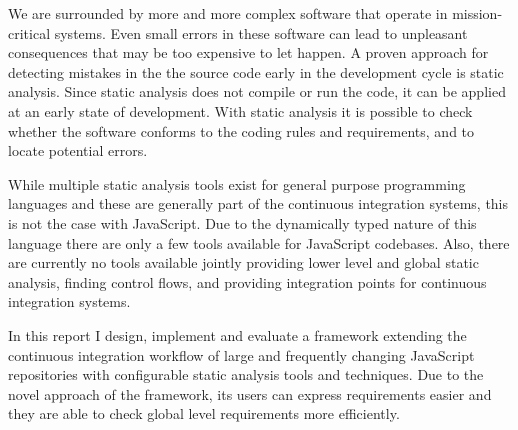 We are surrounded by more and more complex software that operate in mission-critical systems. Even small errors in these software can lead to unpleasant consequences that may be too expensive to let happen. A proven approach for detecting mistakes in the the source code early in the development cycle is static analysis. Since static analysis does not compile or run the code, it can be applied at an early state of development. With static analysis it is possible to check whether the software conforms to the coding rules and requirements, and to locate potential errors.

While multiple static analysis tools exist for general purpose programming languages and these are generally part of the continuous integration systems, this is not the case with JavaScript. Due to the dynamically typed nature of this language there are only a few tools available for JavaScript codebases. Also, there are currently no tools available jointly providing lower level and global static analysis, finding control flows, and providing integration points for continuous integration systems.

In this report I design, implement and evaluate a framework extending the continuous integration workflow of large and frequently changing JavaScript repositories with configurable static analysis tools and techniques. Due to the novel approach of the framework, its users can express requirements easier and they are able to check global level requirements more efficiently.

\clearpage
